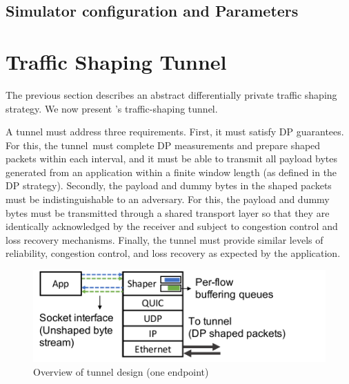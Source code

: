 \subsection{Simulator configuration and Parameters}



\section{Traffic Shaping Tunnel}\label{sec:tunnel-overview}

The previous section describes an abstract differentially private traffic shaping strategy.
We now present \sys's traffic-shaping tunnel.

A tunnel must address three requirements. First, it must satisfy DP guarantees. For this, the tunnel~must complete DP measurements and prepare shaped packets within each interval, and it must be able to transmit all payload bytes generated from an application within a finite window length (as defined in the DP strategy).
%
Secondly, the payload and dummy bytes in the shaped packets must be indistinguishable to an adversary.
For this, the payload and dummy bytes must be transmitted through a shared transport layer so that they are identically acknowledged by the receiver and subject to congestion control and loss recovery mechanisms.
%
Finally, the tunnel must provide similar levels of reliability, congestion control, and loss recovery as expected by the application.
\begin{figure}[t]
  \centering
  \includegraphics[width=\columnwidth]{figures/design2.pdf}
  \caption{Overview of tunnel design (one endpoint)
  }
  \label{fig:minesvpn-overview}
\end{figure}

